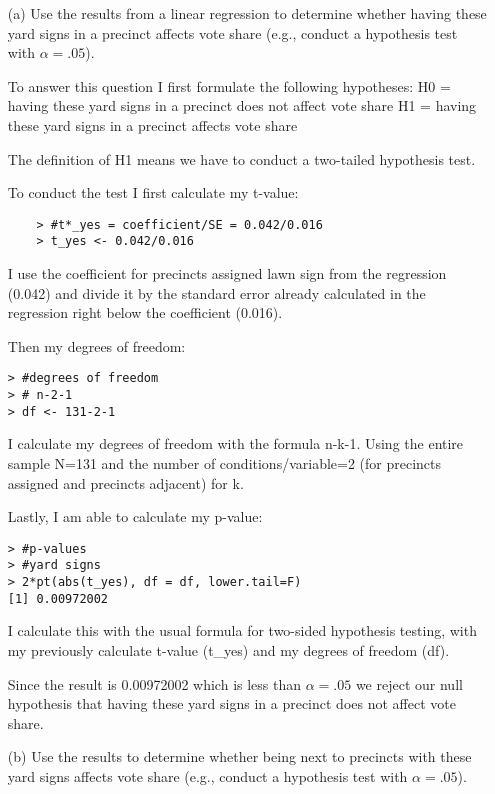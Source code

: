 \documentclass[12pt,letterpaper]{article}
\begin{document}
\vspace{.5cm}
\begin{enumerate}
	\item [(a)] Use the results from a linear regression to determine whether having these yard signs in a precinct affects vote share (e.g., conduct a hypothesis test with $\alpha = .05$).
	
	To answer this question I first formulate the following hypotheses: \newline
	H0 = having these yard signs in a precinct does not affect vote share \newline
	H1 = having these yard signs in a precinct affects vote share
	
	The definition of H1 means we have to conduct a two-tailed hypothesis test.
	
	To conduct the test I first calculate my t-value:
	\begin{verbatim}
	> #t*_yes = coefficient/SE = 0.042/0.016
	> t_yes <- 0.042/0.016
\end{verbatim}
I use the coefficient for precincts assigned lawn sign from the regression (0.042) and divide it by the standard error already calculated in the regression right below the coefficient (0.016).

Then my degrees of freedom:
\begin{verbatim}
> #degrees of freedom
> # n-2-1
> df <- 131-2-1
\end{verbatim}
I calculate my degrees of freedom with the formula n-k-1. Using the entire sample N=131 and the number of conditions/variable=2 (for precincts assigned and precincts adjacent) for k. 

Lastly, I am able to calculate my p-value:
\begin{verbatim}
> #p-values
> #yard signs
> 2*pt(abs(t_yes), df = df, lower.tail=F)
[1] 0.00972002
\end{verbatim}
I calculate this with the usual formula for two-sided hypothesis testing, with my previously calculate t-value (t\_yes) and my degrees of freedom (df). 

Since the result is 0.00972002 which is less than $\alpha = .05$ we reject our null hypothesis that having these yard signs in a precinct does not affect vote share.
	
	\newpage		
	\item [(b)]  Use the results to determine whether being
	next to precincts with these yard signs affects vote
	share (e.g., conduct a hypothesis test with $\alpha = .05$).
	

\end{enumerate}
\end{document}
